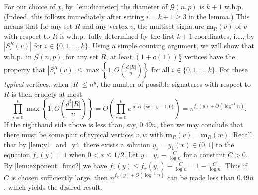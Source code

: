 \documentclass[12pt]{article}
\newtheorem{lemma}[theorem]{Lemma}
\theoremstyle{definition}
\theoremstyle{remark}
\theoremstyle{remark}
\numberwithin{theorem}{section}
\newcommand{\Gnp}{\mathcal{G}(n,p)}
\begin{document}
For our choice of $x$, by \cref{lem:diameter} the diameter of $\Gnp$ is $k+1$ w.h.p. (Indeed, this follows immediately after setting $i = k+1 \geq 3$ in the lemma.) This means that for any set $R$ and any vertex $v$, the multiset signature $\bm{m}_{R}(v)$ of $v$ with respect to $R$ is w.h.p.\ fully determined by the first $k+1$ coordinates, i.e., by $|S_{i}^{R}(v)|$ for $i \in \{ 0,1,\dots,k\}$. Using a simple counting argument, we will show that w.h.p.\ in $\Gnp$, for any set $R$, at least $(1+o(1))\frac{n}{2}$ vertices have the property that $|S_{i}^{R}(v)| \leq \max\left\{1, O\left(\frac{d^{i}|R|}{n}\right)\right\}$ for all $i  \in \{ 0,1,\dots,k\} $. For these \textit{typical} vertices, when $|R| \leq n^{y}$, the number of possible signatures with respect to $R$ is then crudely at most
$$
	\prod_{i=0}^{k} \max\left\{1, O\left(\frac{d^{i}|R|}{n}\right)\right\} = O\left(\prod_{i=0}^{k} n^{\max\{ix + y - 1, 0\}} \right) = n^{f_{x}(y) + O(\log^{-1} n)}.
$$
If the righthand side above is less than, say, $0.49n$, then we may conclude that there must be some pair of typical vertices $v,w$ with $\bm{m}_{R}(v) = \bm{m}_{R}(w)$. Recall that by \cref{lem:y1_and_y4} there exists a solution $y_{1} = y_{1}(x) \in (0,1]$ to the equation $f_{x}(y) = 1$ when $0 < x \leq 1/2.$ Let $y = y_{1} -\frac{C}{\log n}$ for a constant $C > 0$. By \cref{lem:exponent_func2} we have $f_{x}(y) \leq f_{x}(y_{1}) - \frac{C}{\log n} = 1 - \frac{C}{\log n}$. Thus if $C$ is chosen sufficiently large, then $n^{f_{x}(y) + O(\log^{-1}n)}$ can be made less than $0.49n$, which yields the desired result. 

\end{document}
